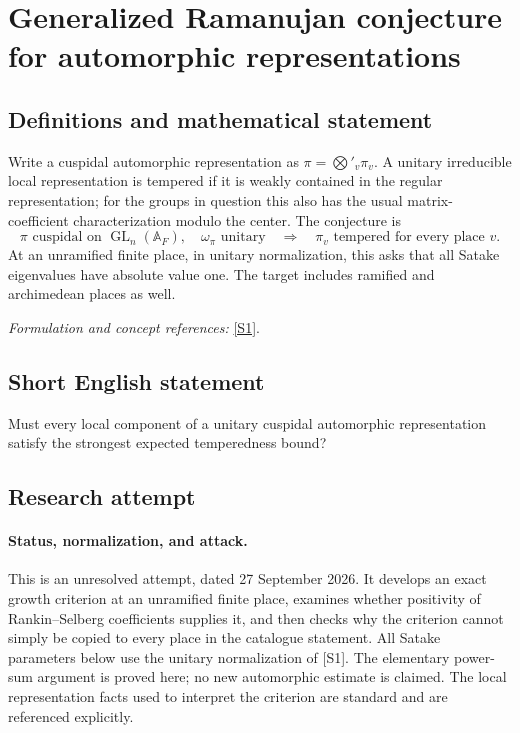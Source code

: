 \documentclass[11pt]{article}
\begin{document}
\section*{\texorpdfstring{Generalized Ramanujan conjecture for automorphic representations}{Generalized Ramanujan conjecture for automorphic representations}}\label{statement}
\subsection{Definitions and mathematical statement}
Write a cuspidal automorphic representation as $\pi=\bigotimes'_v\pi_v$. A unitary irreducible local representation is tempered if it is weakly contained in the regular representation; for the groups in question this also has the usual matrix-coefficient characterization modulo the center. The conjecture is
\[
 \pi\text{ cuspidal on }\operatorname{GL}_n({\mathbb{A}}_F),\quad
 \omega_\pi\text{ unitary}\quad\Longrightarrow\quad
 \pi_v\text{ tempered for every place }v.
\]
At an unramified finite place, in unitary normalization, this asks that all Satake eigenvalues have absolute value one. The target includes ramified and archimedean places as well.
\par\smallskip\textit{Formulation and concept references:} \href{https://web.math.princeton.edu/~sarnak/Preprints/SarnakFieldsNotes.pdf}{[S1]}.

\subsection{Short English statement}
Must every local component of a unitary cuspidal automorphic representation satisfy the strongest expected temperedness bound?
\subsection{Research attempt}
\paragraph{Status, normalization, and attack.}
This is an unresolved attempt, dated 27 September 2026. It develops an exact
growth criterion at an unramified finite place, examines whether positivity
of Rankin--Selberg coefficients supplies it, and then checks why the criterion
cannot simply be copied to every place in the catalogue statement.
All Satake parameters below use the unitary normalization of [S1]. The
elementary power-sum argument is proved here; no new automorphic estimate
is claimed. The local representation facts used to interpret the criterion
are standard and are referenced explicitly.
\end{document}
